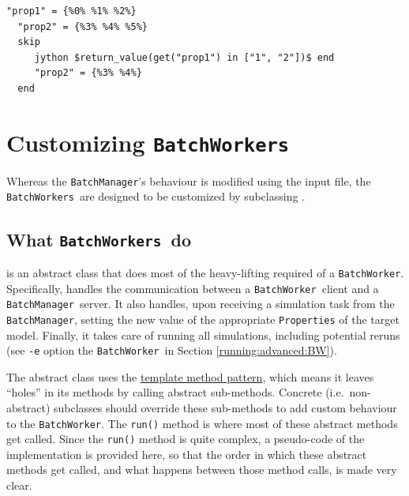 \documentclass{article}
\newcommand{\BM}{{\tt BatchManager}}
\newcommand{\BW}{{\tt BatchWorker}}
\newcommand{\BWs}{{\tt BatchWorkers}}
\begin{document}
\begin{lstlisting}[]
  "prop1" = {%0% %1% %2%}
  "prop2" = {%3% %4% %5%}
  skip
     jython $return_value(get("prop1") in ["1", "2"])$ end
     "prop2" = {%3% %4%}
  end
\end{lstlisting}

\section{Customizing \BWs}
\label{custom}

Whereas the \BM's behaviour is modified using the input file, the \BWs\ are designed to be customized by subclassing .

\subsection{What \BWs\ do}

 is an abstract class that does most of the heavy-lifting required of a \BW. Specifically,  handles the communication between a \BW\ client and a \BM\ server. It also handles, upon receiving a simulation task from the \BM, setting the new value of the appropriate {\tt Properties} of the target model. Finally, it takes care of running all simulations, including potential reruns (see {\tt -e} option the \BW\ in Section \ref{running:advanced:BW}).
 
The abstract  class uses the \href{https://en.wikipedia.org/wiki/Template_method_pattern}{template method pattern}, which means it leaves ``holes'' in its methods by calling abstract sub-methods. Concrete (i.e.\ non-abstract) subclasses should override these sub-methods to add custom behaviour to the \BW. The {\tt run()} method is where most of these abstract methods get called. Since the {\tt run()} method is quite complex, a pseudo-code of the implementation is provided here, so that the order in which these abstract methods get called, and what happens between those method calls, is made very clear.
\end{document}
